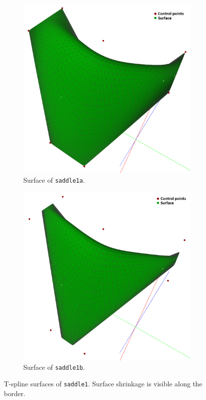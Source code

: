 \documentclass{article}
\begin{document}
\begin{figure}[H]
\centering
\begin{subfigure}[b]{0.48\textwidth}
\includegraphics[width=\textwidth]{saddle1a}
\caption{Surface of \texttt{saddle1a}.}
\label{saddle1a}
\end{subfigure}
\begin{subfigure}[b]{0.48\textwidth}
\includegraphics[width=\textwidth]{saddle1b}
\caption{Surface of \texttt{saddle1b}.}
\label{saddle1b}
\end{subfigure}
\caption{T-spline surfaces of \texttt{saddle1}. Surface shrinkage is visible along the border.}
\label{saddle1}
\end{figure}
\end{document}
